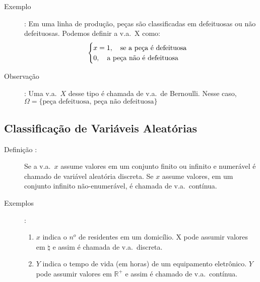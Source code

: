 \documentclass[11pt,a4paper]{book}
\begin{document}
\begin{description}
     \item [Exemplo]: Em uma linha de produção, peças são classificadas em defeituosas ou não
       defeituosas. Podemos definir a v.a.\ X como:
       \begin{align*}
         \begin{cases}
           x=1,\text{\quad  se a peça é defeituosa}\\ 
           0,\text{\quad  a peça não é defeituosa}
         \end{cases}
       \end{align*}
     \item [Observação]: Uma v.a.\ $X$ desse tipo é chamada de v.a.\ de Bernoulli. Nesse caso, $\Omega=\{ \text{peça defeituosa, peça não defeituosa} \}$
   \end{description}
   \subsection{Classificação de Variáveis Aleatórias}
   \begin{description}
     \item [Definição :] Se a v.a.\ $x$ assume valores em um conjunto finito ou infinito e numerável é chamado 
       de variável aleatória discreta. Se $x$ assume valores, em um conjunto infinito não-enumerável,
       é chamada de v.a.\ contínua.

     \item [Exemplos]:

       \begin{enumerate}[label=(\alph*)]
         \item $x$ indica o $n^o$ de residentes em um domicílio. X pode assumir valores em $\natural$ e assim é chamada de 
           v.a.\ discreta.

         \item $Y$ indica o tempo de vida (em horas) de um equipamento eletrônico. $Y$ pode 
           assumir valores em $\mathbb{R}^+$ e assim é chamado de v.a.\ contínua.
       \end{enumerate}
   \end{description}
\end{document}
